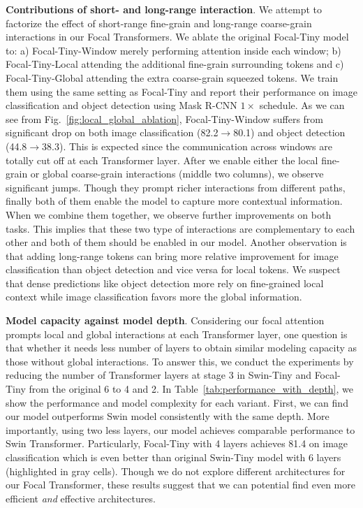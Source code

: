 \documentclass{article}
\begin{document}
\textbf{Contributions of short- and long-range interaction}. We attempt to factorize the effect of short-range fine-grain and long-range coarse-grain interactions in our Focal Transformers. We ablate the original Focal-Tiny model to: a) Focal-Tiny-Window merely performing attention inside each window; b) Focal-Tiny-Local attending the additional fine-grain surrounding tokens and c) Focal-Tiny-Global attending the extra coarse-grain squeezed tokens. We train them using the same setting as Focal-Tiny and report their performance on image classification and object detection using Mask R-CNN $1\times$ schedule. As we can see from Fig.~\ref{fig:local_global_ablation}, Focal-Tiny-Window suffers from significant drop on both image classification (82.2$\rightarrow$80.1) and object detection (44.8$\rightarrow$38.3). This is expected since the communication across windows are totally cut off at each Transformer layer. After we enable either the local fine-grain or global coarse-grain interactions (middle two columns), we observe significant jumps. Though they prompt richer interactions from different paths, finally both of them enable the model to capture more contextual information. When we combine them together, we observe further improvements on both tasks. This implies that these two type of interactions are complementary to each other and both of them should be enabled in our model. Another observation is that adding long-range tokens can bring more relative improvement for image classification than object detection and vice versa for local tokens. We suspect that dense predictions like object detection more rely on fine-grained local context while image classification favors more the global information.


\textbf{Model capacity against model depth}. Considering our focal attention prompts local and global interactions at each Transformer layer, one question is that whether it needs less number of layers to obtain similar modeling capacity as those without global interactions. To answer this, we conduct the experiments by reducing the number of Transformer layers at stage 3 in Swin-Tiny and Focal-Tiny from the original 6 to 4 and 2. In Table~\ref{tab:performance_with_depth}, we show the performance and model complexity for each variant. First, we can find our model outperforms Swin model consistently with the same depth. More importantly, using two less layers, our model achieves comparable performance to Swin Transformer. Particularly, Focal-Tiny with 4 layers achieves 81.4 on image classification which is even better than original Swin-Tiny model with 6 layers (highlighted in gray cells). Though we do not explore different architectures for our Focal Transformer, these results suggest that we can potential find even more efficient \emph{and} effective architectures.
\end{document}

